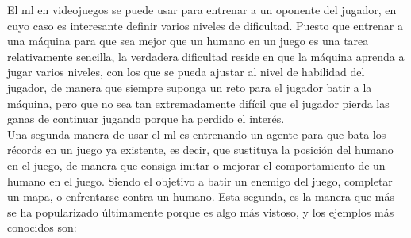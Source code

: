 El \gls{ml} en videojuegos se puede usar para entrenar a un oponente del jugador, en cuyo caso es interesante definir varios niveles de dificultad. Puesto que entrenar a una máquina para que sea mejor que un humano en un juego es una tarea relativamente sencilla, la verdadera dificultad reside en que la máquina aprenda a jugar varios niveles, con los que se pueda ajustar al nivel de habilidad del jugador, de manera que siempre suponga un reto para el jugador batir a la máquina, pero que no sea tan extremadamente difícil que el jugador pierda las ganas de continuar jugando porque ha perdido el interés.
\\
Una segunda manera de usar el \gls{ml} es entrenando un agente para que bata los récords en un juego ya existente, es decir, que sustituya la posición del humano en el juego, de manera que consiga imitar o mejorar el comportamiento de un humano en el juego. Siendo el objetivo a batir un enemigo del juego, completar un mapa, o enfrentarse contra un humano. Esta segunda, es la manera que más se ha popularizado últimamente porque es algo más vistoso, y los ejemplos más conocidos son:

